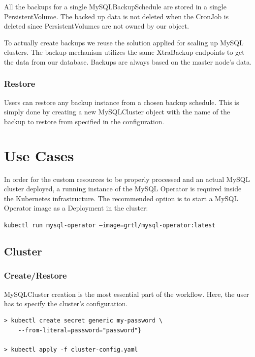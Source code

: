 All the backups for a single MySQLBackupSchedule are stored in a single 
PersistentVolume. The backed up data is not deleted when the CronJob is 
deleted since PersistentVolumes are not owned by our object.

To actually create backups we reuse the solution applied for scaling 
up MySQL clusters. The backup mechanism utilizes the same XtraBackup endpoints 
to get the data from our database. Backups are always based on the master 
node’s data.


\subsubsection*{Restore}
Users can restore any backup instance from a chosen backup schedule. This is simply done by creating
a new MySQLCluster object with the name of the backup to restore from specified in the
configuration.

\section{Use Cases}
In order for the custom resources to be properly processed and an actual MySQL cluster deployed, a
running instance of the MySQL Operator is required inside the Kubernetes infrastructure. The
recommended option is to start a MySQL Operator image as a Deployment in the cluster:

\texttt{kubectl run mysql-operator --image=grtl/mysql-operator:latest}

\subsection{Cluster}
\subsubsection*{Create/Restore}

MySQLCluster creation is the most essential part of the 
workflow. Here, the user has to specify the cluster's configuration.

\begin{lstlisting}
> kubectl create secret generic my-password \
	--from-literal=password="password"}

> kubectl apply -f cluster-config.yaml
\end{lstlisting}

